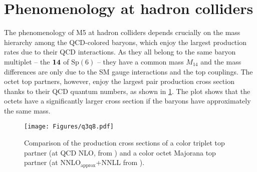 \documentclass[preprintnumbers,nofootinbib,showpacs,eqsecnum,pre,12pt]{revtex4-1}
\newcommand{\Sp}{\text{Sp}}
\begin{document}
\section{Phenomenology at hadron colliders}
\label{sec:LHCpheno}


The phenomenology of M5 at hadron colliders depends crucially on the mass hierarchy among the QCD-colored baryons, which enjoy the largest production rates due to their QCD interactions. As they all belong to the same baryon multiplet -- the $\bf{14}$ of $\Sp(6)$ -- they have a common mass $M_{14}$ and the mass differences are only due to the SM gauge interactions and the top couplings.
The octet top partners, however, enjoy the largest pair production cross section thanks to their QCD quantum numbers, as shown in \cref{fig:q3q8xs}. The plot shows that the octets have a significantly larger cross section if the baryons have approximately the same mass. 

\begin{figure}
	\centering
	\texttt{[image: Figures/q3q8.pdf]}
	\caption{Comparison of the production cross sections of a color triplet top partner (at QCD NLO, from \cite{Fuks:2016ftf}) and a color octet Majorana top partner (at NNLO$_\text{approx}$+NNLL from \cite{Beenakker:2016lwe}).}
	\label{fig:q3q8xs}
\end{figure}
\end{document}
